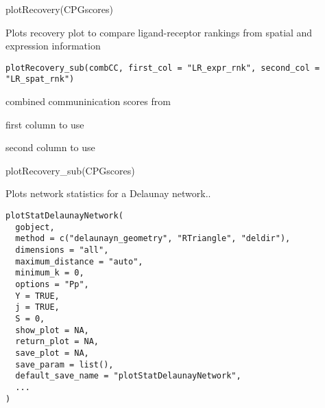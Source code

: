 \documentclass[a4paper]{book}
\begin{document}
%
\begin{Examples}
\begin{ExampleCode}
    plotRecovery(CPGscores)
\end{ExampleCode}
\end{Examples}
%
\begin{Description}\relax
Plots recovery plot to compare ligand-receptor rankings from spatial and expression information
\end{Description}
%
\begin{Usage}
\begin{verbatim}
plotRecovery_sub(combCC, first_col = "LR_expr_rnk", second_col = "LR_spat_rnk")
\end{verbatim}
\end{Usage}
%
\begin{Arguments}
\begin{ldescription}
\item[\code{combCC}] combined communinication scores from 

\item[\code{first\_col}] first column to use

\item[\code{second\_col}] second column to use
\end{ldescription}
\end{Arguments}
%
\begin{Examples}
\begin{ExampleCode}
    plotRecovery_sub(CPGscores)
\end{ExampleCode}
\end{Examples}
%
\begin{Description}\relax
Plots network statistics for a Delaunay network..
\end{Description}
%
\begin{Usage}
\begin{verbatim}
plotStatDelaunayNetwork(
  gobject,
  method = c("delaunayn_geometry", "RTriangle", "deldir"),
  dimensions = "all",
  maximum_distance = "auto",
  minimum_k = 0,
  options = "Pp",
  Y = TRUE,
  j = TRUE,
  S = 0,
  show_plot = NA,
  return_plot = NA,
  save_plot = NA,
  save_param = list(),
  default_save_name = "plotStatDelaunayNetwork",
  ...
)
\end{verbatim}
\end{Usage}
\end{document}
